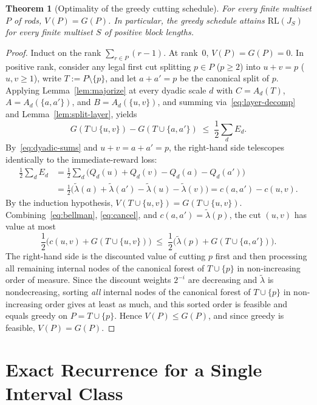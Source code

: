 \documentclass[11pt]{article}
\theoremstyle{plain}
\newtheorem{theorem}{Theorem}
\theoremstyle{definition}
\theoremstyle{remark}
\newcommand{\RL}{\mathrm{RL}}
\begin{document}
\begin{theorem}[Optimality of the greedy cutting schedule]\label{thm:greedy}
For every finite multiset $P$ of rods, $V(P) = G(P)$. In particular, the greedy schedule attains $\RL(J_S)$ for every finite multiset $S$ of positive block lengths.
\end{theorem}

\begin{proof}
Induct on the rank $\sum_{r \in P}(r - 1)$. At rank~$0$, $V(P) = G(P) = 0$.
In positive rank, consider any legal first cut splitting $p \in P$ ($p \ge 2$) into $u + v = p$ ($u, v \ge 1$), write $T := P \setminus \{p\}$, and let $a + a' = p$ be the canonical split of $p$.
Applying Lemma~\ref{lem:majorize} at every dyadic scale $d$ with $C = A_d(T)$, $A = A_d(\{a, a'\})$, and $B = A_d(\{u, v\})$, and summing via~\eqref{eq:layer-decomp} and Lemma~\ref{lem:split-layer}, yields
\[
G(T \cup \{u, v\}) - G(T \cup \{a, a'\}) \;\le\; \frac{1}{2}\sum_d E_d.
\]
By~\eqref{eq:dyadic-sums} and $u + v = a + a' = p$, the right-hand side telescopes identically to the immediate-reward loss:
\begin{align}
\frac{1}{2}\sum_d E_d
&= \frac{1}{2}\sum_d \bigl(Q_d(u) + Q_d(v) - Q_d(a) - Q_d(a')\bigr) \nonumber \\
&= \frac{1}{2}\bigl(\tilde\lambda(a) + \tilde\lambda(a') - \tilde\lambda(u) - \tilde\lambda(v)\bigr)
= c(a, a') - c(u, v). \label{eq:cancel}
\end{align}
By the induction hypothesis, $V(T \cup \{u, v\}) = G(T \cup \{u, v\})$. Combining~\eqref{eq:bellman}, \eqref{eq:cancel}, and $c(a, a') = \tilde\lambda(p)$, the cut $(u, v)$ has value at most
\[
\frac{1}{2}\bigl(c(u, v) + G(T \cup \{u, v\})\bigr)
\;\le\;
\frac{1}{2}\bigl(\tilde\lambda(p) + G(T \cup \{a, a'\})\bigr).
\]
The right-hand side is the discounted value of cutting $p$ first and then processing all remaining internal nodes of the canonical forest of $T \cup \{p\}$ in non-increasing order of measure.
Since the discount weights $2^{-i}$ are decreasing and $\tilde\lambda$ is nondecreasing, sorting \emph{all} internal nodes of the canonical forest of $T \cup \{p\}$ in non-increasing order gives at least as much, and this sorted order is feasible and equals greedy on $P = T \cup \{p\}$.
Hence $V(P) \le G(P)$, and since greedy is feasible, $V(P) = G(P)$.
\end{proof}

\section{Exact Recurrence for a Single Interval Class}
\end{document}
